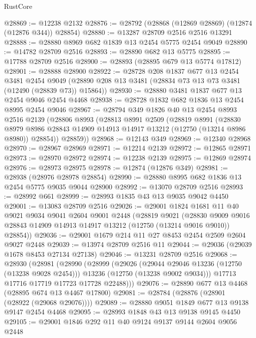 \begin{lexlean}{RustCore}
\begin{coremodule}
@28869 := @12238 @2132
@28876 := @28792 (@28868 (@12869 @28869) (@12874 (@12876 @344)) @28854)
@28880 := @13287 @28709 @2516 @2516 @13291
@28888 := @28880 @8969 @682 @1839 @13 @2454 @5775 @2454 @9049
@28890 := @14782 @28709 @2516
@28893 := @28890 @682 @13 @5775
@28895 := @17788 @28709 @2516
@28900 := @28893 (@28895 @679 @13 @5774 @17812)
@28901 := @28888 @28900
@28922 := @28728
    @208
    @1837
    @677
    @13
    @2454
    @3481
    @2454
    @9049
    (@28890 @208 @13 @3481 (@28834 @73 @13 @73 @3481 (@12490 (@28839 @73)) @15864))
@28930 := @28880 @3481 @1837 @677 @13 @2454 @9046 @2454 @4468
@28938 := @28728 @1832 @682 @1836 @13 @2454 @8995 @2454 @9046
@28967 := @28794
    @349
    @1826
    @40
    @13
    @2454
    @8993
    @2516
    @2139
    (@28806
      @8993
      (@28813
        @8991
        @2509
        (@28819
          @8991
          (@28830
            @8979
            @8986
            @28843
            @14909
            @14913
            @14917
            @13212
            (@12750 (@13214 @8986 @8980))
            @28854))
        @28859))
@28968 := @12143 @349
@28969 := @12340 @28968
@28970 := @28967 @28969
@28971 := @12214 @2139
@28972 := @12865 @28971
@28973 := @28970 @28972
@28974 := @12238 @2139
@28975 := @12869 @28974
@28976 := @28973 @28975
@28978 := @12874 (@12876 @349)
@28981 := @28938 (@28976 @28978 @28854)
@28990 := @28880 @8995 @682 @1836 @13 @2454 @5775 @9035 @9044 @28900
@28992 := @13070 @28709 @2516
@28993 := @28992 @661
@28999 := @28993 @1835 @43 @13 @9035 @9042 @4450
@29001 := @13083 @28709 @2516
@29026 := @29001
    @1824
    @1681
    @11
    @40
    @9021
    @9034
    @9041
    @2604
    @9001
    @2448
    (@28819
      @9021
      (@28830 @9009 @9016 @28843 @14909 @14913 @14917 @13212 (@12750 (@13214 @9016 @9010)) @28854))
@29036 := @29001 @1679 @214 @11 @27 @8453 @2454 @2509 @2604 @9027 @2448
@29039 := @13974 @28709 @2516 @11
@29044 := @29036 (@29039 @1678 @8453 @27134 @27138)
@29046 := @13231 @28709 @2516
@29068 := @28930
    (@28981
      (@28990
        (@28999
          (@29026
            (@29044 @29046 @13236 (@12750 (@13238 @9028 @2454)))
            @13236
            (@12750 (@13238 @9002 @9034)))
          @17713
          @17716
          @17719
          @17723
          @17728
          @22488)))
@29076 := @28890 @677 @13 @4468 (@28895 @674 @13 @4467 @17800)
@29081 := @28784 (@28876 (@28901 (@28922 (@29068 @29076))))
@29089 := @28880 @9051 @1849 @677 @13 @9138 @9147 @2454 @4468
@29095 := @28993 @1848 @43 @13 @9138 @9145 @4450
@29105 := @29001 @1846 @292 @11 @40 @9124 @9137 @9144 @2604 @9056 @2448

\end{coremodule}
\end{lexlean}
